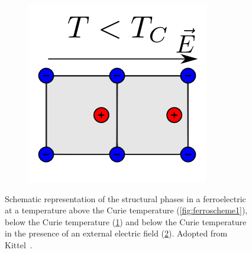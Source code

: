 \begin{figure}
\begin{subfigure}{0.3\textwidth}
	\caption{}
	\label{fig:ferroscheme2}
\end{subfigure}
\begin{subfigure}{0.3\textwidth}
\centering
	\includegraphics[width=0.9\linewidth]{./figs/chap1/ferroscheme3}
	\caption{}
	\label{fig:ferroscheme3}
\end{subfigure}
\caption{Schematic representation of the structural phases in a ferroelectric at a temperature above the Curie temperature (\ref{fig:ferroscheme1}), below the Curie temperature (\ref{fig:ferroscheme2}) and below the Curie temperature in the presence of an external electric field (\ref{fig:ferroscheme3}). Adopted from Kittel~\cite[p. 478]{kittel}.}
\label{fig:ferroscheme}
\end{figure}
